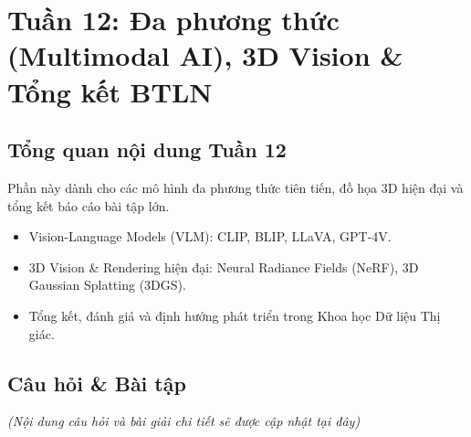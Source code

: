 \section{Tuần 12: Đa phương thức (Multimodal AI), 3D Vision \& Tổng kết BTLN}
\label{sec:week12}

\subsection{Tổng quan nội dung Tuần 12}
Phần này dành cho các mô hình đa phương thức tiên tiến, đồ họa 3D hiện đại và tổng kết báo cáo bài tập lớn.

\begin{itemize}
    \item Vision-Language Models (VLM): CLIP, BLIP, LLaVA, GPT-4V.
    \item 3D Vision \& Rendering hiện đại: Neural Radiance Fields (NeRF), 3D Gaussian Splatting (3DGS).
    \item Tổng kết, đánh giá và định hướng phát triển trong Khoa học Dữ liệu Thị giác.
\end{itemize}

\subsection{Câu hỏi \& Bài tập}
\textit{(Nội dung câu hỏi và bài giải chi tiết sẽ được cập nhật tại đây)}
